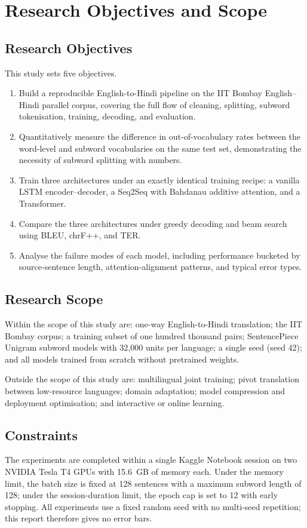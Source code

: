 \documentclass[a4paper,12pt]{vpcoe}
\begin{document}
\chapter{Research Objectives and Scope}

\section{Research Objectives}
This study sets five objectives.
\begin{enumerate}
  \item Build a reproducible English-to-Hindi pipeline on the IIT Bombay English--Hindi parallel corpus, covering the full flow of cleaning, splitting, subword tokenisation, training, decoding, and evaluation.
  \item Quantitatively measure the difference in out-of-vocabulary rates between the word-level and subword vocabularies on the same test set, demonstrating the necessity of subword splitting with numbers.
  \item Train three architectures under an exactly identical training recipe: a vanilla LSTM encoder--decoder, a Seq2Seq with Bahdanau additive attention, and a Transformer.
  \item Compare the three architectures under greedy decoding and beam search using BLEU, chrF++, and TER.
  \item Analyse the failure modes of each model, including performance bucketed by source-sentence length, attention-alignment patterns, and typical error types.
\end{enumerate}

\section{Research Scope}
Within the scope of this study are: one-way English-to-Hindi translation; the IIT Bombay corpus; a training subset of one hundred thousand pairs; SentencePiece Unigram subword models with 32,000 units per language; a single seed (seed 42); and all models trained from scratch without pretrained weights.

Outside the scope of this study are: multilingual joint training; pivot translation between low-resource languages; domain adaptation; model compression and deployment optimisation; and interactive or online learning.

\section{Constraints}
The experiments are completed within a single Kaggle Notebook session on two NVIDIA Tesla T4 GPUs with 15.6~GB of memory each. Under the memory limit, the batch size is fixed at 128 sentences with a maximum subword length of 128; under the session-duration limit, the epoch cap is set to 12 with early stopping. All experiments use a fixed random seed with no multi-seed repetition; this report therefore gives no error bars.
\end{document}
